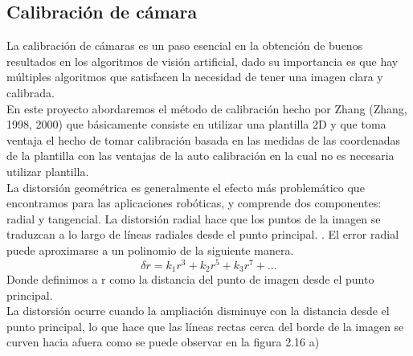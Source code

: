 \subsection{Calibración de cámara}
La calibración de cámaras es un paso esencial en la obtención de buenos resultados
en los algoritmos de visión artificial, dado su importancia es que hay múltiples
algoritmos que satisfacen la necesidad de tener una imagen clara y calibrada.\\
En este proyecto abordaremos el método de calibración hecho por Zhang (Zhang, 1998, 2000)
que básicamente consiste en utilizar una plantilla 2D y que toma ventaja el hecho de tomar
calibración basada en las medidas de
las coordenadas de la plantilla con las ventajas de la
auto calibración en la cual no es necesaria utilizar
plantilla.\\
La distorsión geométrica es generalmente el efecto más problemático que encontramos para las aplicaciones robóticas,
y comprende dos componentes: radial y tangencial. La distorsión radial hace que los puntos de la imagen se
traduzcan a lo largo de líneas radiales desde el punto principal. \cite{Book:Corke2011}. El error radial puede
aproximarse a un polinomio de la siguiente manera.
\begin{equation}
	\delta r = k_1 r^3 + k_2 r^5 + k_3 r^7 + ...
\end{equation}
Donde definimos a r como la distancia del punto de imagen desde el punto principal.\\
La distorsión ocurre cuando la ampliación disminuye con la distancia desde el punto principal, lo que hace
que las líneas rectas cerca del borde de la imagen se curven hacia afuera como se puede observar en la figura 2.16 a)
